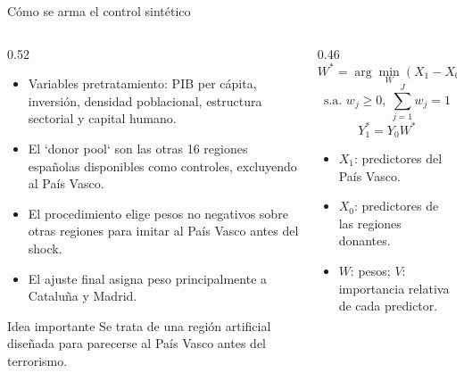 \documentclass[aspectratio=1610]{beamer}
\begin{document}
\begin{frame}{Cómo se arma el control sintético}
    \begin{columns}[T,totalwidth=\textwidth]
        \begin{column}{0.52\textwidth}
            \begin{itemize}
                \item Variables pretratamiento: PIB per cápita, inversión, densidad poblacional, estructura sectorial y capital humano.
                \item El `donor pool` son las otras 16 regiones españolas disponibles como controles, excluyendo al País Vasco.
                \item El procedimiento elige pesos no negativos sobre otras regiones para imitar al País Vasco antes del shock.
                \item El ajuste final asigna peso principalmente a Cataluña y Madrid.
            \end{itemize}
            \begin{block}{Idea importante}
                Se trata de una región artificial diseñada para parecerse al País Vasco antes del terrorismo.
            \end{block}
        \end{column}
        \begin{column}{0.46\textwidth}
            \begin{equation*}
                W^*=\arg\min_W \left(X_1-X_0W\right)'V\left(X_1-X_0W\right)
            \end{equation*}
            \begin{equation*}
                \text{s.a. } w_j \geq 0,\ \sum_{j=1}^{J} w_j = 1
            \end{equation*}
            \begin{equation*}
                Y_1^* = Y_0W^*
            \end{equation*}
            {\scriptsize
            \begin{itemize}
                \item $X_1$: predictores del País Vasco.
                \item $X_0$: predictores de las regiones donantes.
                \item $W$: pesos; $V$: importancia relativa de cada predictor.
            \end{itemize}}
        \end{column}
    \end{columns}
\end{frame}
\end{document}
